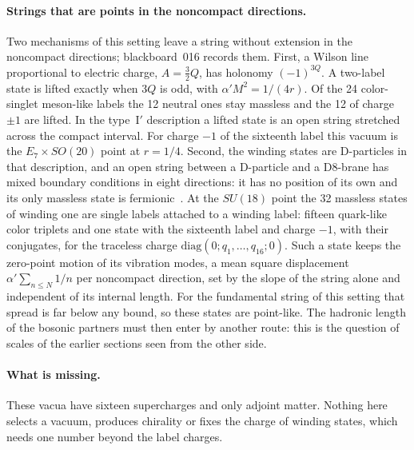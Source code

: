 \paragraph{Strings that are points in the noncompact directions.}
Two mechanisms of this setting leave a string without extension in the
noncompact directions; blackboard~016 records them. First, a Wilson
line proportional to electric charge, $A=\tfrac32Q$, has holonomy
$(-1)^{3Q}$. A two-label state is lifted exactly when $3Q$ is odd, with
$\alpha'M^2=1/(4r)$. Of the 24 color-singlet meson-like labels the 12
neutral ones stay massless and the 12 of charge $\pm1$ are lifted. In
the type~I$'$ description a lifted state is an open string stretched
across the compact interval. For charge $-1$ of the sixteenth label this
vacuum is the $E_7\times SO(20)$ point at $r=1/4$. Second, the winding
states are D-particles in that description, and an open string between
a D-particle and a D8-brane has mixed boundary conditions in eight
directions: it has no position of its own and its only massless state
is fermionic~\cite{BGS,BGL}. At the $SU(18)$ point the 32 massless
states of winding one are single labels attached to a winding label:
fifteen quark-like color triplets and one state with the sixteenth
label and charge $-1$, with their conjugates, for the traceless charge
$\mathrm{diag}(0;q_1,\dots,q_{16};0)$. Such a state keeps the
zero-point motion of its vibration modes, a mean square displacement
$\alpha'\sum_{n\le N}1/n$ per noncompact direction, set by the slope of
the string alone and independent of its internal length. For
the fundamental string of this setting that spread is far below any
bound, so these states are point-like. The hadronic length of the
bosonic partners must then enter by another route: this is the question
of scales of the earlier sections seen from the other side.

\paragraph{What is missing.}
These vacua have sixteen supercharges and only adjoint matter. Nothing
here selects a vacuum, produces chirality or fixes the charge of
winding states, which needs one number beyond the label charges.

